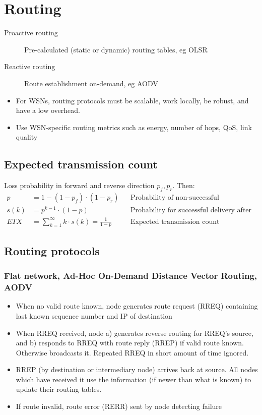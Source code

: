 \section{Routing}

\begin{description}
		\item[Proactive routing] Pre-calculated (static or dynamic) routing tables, eg OLSR
		\item[Reactive routing] Route establishment on-demand, eg AODV
\end{description}

\begin{itemize}
		\item For WSNs, routing protocols must be scalable, work locally, be
				robust, and have a low overhead.
		\item Use WSN-specific routing metrics such as energy, number of hops,
				QoS, link quality
\end{itemize}

\subsection{Expected transmission count}

Loss probability in forward and reverse direction $p_f, p_r$. Then: 
\begin{align*}
		p & = 1 - (1 - p_f) \cdot (1 - p_r) && \text{Probability of non-successful transmission} \\
		s(k) & = p^{k-1} \cdot (1 - p) && \text{Probability for successful delivery after k attempts} \\
		ETX & = \sum_{k = 1}^{\infty} k \cdot s(k) = \frac{1}{1-p} && \text{Expected transmission count}
\end{align*}

\subsection{Routing protocols}

\subsubsection{Flat network, Ad-Hoc On-Demand Distance Vector Routing, AODV}

\begin{itemize}
		\item When no valid route known, node generates route request (RREQ)
				containing last known sequence number and IP of destination
		\item When RREQ received, node a) generates reverse routing for RREQ's
				source, and b) responds to RREQ with route reply (RREP) if
				valid route known.  Otherwise broadcasts it. Repeated RREQ in
				short amount of time ignored.
		\item RREP (by destination or intermediary node) arrives back at
				source. All nodes which have received it use the information
				(if newer than what is known) to update their routing tables.
		\item If route invalid, route error (RERR) sent by node detecting failure
\end{itemize}

